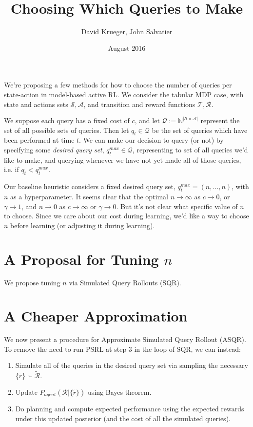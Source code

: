 \documentclass{article}
\title{Choosing Which Queries to Make}
\author{David Krueger, John Salvatier}
\date{August 2016}
\begin{document}
\maketitle


We're proposing a few methods for how to choose the number of queries per state-action in model-based active RL.
We consider the tabular MDP case, with state and actions sets $\mathcal{S}, \mathcal{A}$, and transition and reward functions $\mathcal{T}, \mathcal{R}$.

We suppose each query has a fixed cost of $c$, and let $\mathcal{Q} := \mathbb{N}^{| \mathcal{S} \times \mathcal{A} |}$ represent the set of all possible sets of queries.
Then let $q_t \in \mathcal{Q}$ be the set of queries which have been performed at time $t$.
We can make our decision to query (or not) by specifying some \emph{desired query set}, $q^{max}_t \in \mathcal{Q}$, representing to set of all queries we'd like to make, and querying whenever we have not yet made all of those queries, i.e. if $q_t < q^{max}_t$.

Our baseline heuristic considers a fixed desired query set, $q^{max}_t = (n,...,n)$, with $n$ as a hyperparameter.
It seems clear that the optimal $n \rightarrow \infty$ as $c \rightarrow 0$, or $\gamma \rightarrow 1$, and $n \rightarrow 0$ as $c \rightarrow \infty$ or $\gamma \rightarrow 0$.
But it's not clear what specific value of $n$ to choose.
Since we care about our cost during learning, we'd like a way to choose $n$ before learning (or adjusting it during learning).

\section{A Proposal for Tuning $n$}
We propose tuning $n$ via Simulated Query Rollouts (SQR).


\section{A Cheaper Approximation}
We now present a procedure for Approximate Simulated Query Rollout (ASQR).
To remove the need to run PSRL at step 3 in the loop of SQR, we can instead:

\begin{enumerate}
\item Simulate all of the queries in the desired query set via sampling the necessary $\{\tilde{r}\} \sim \tilde{\mathcal{R}}$.
\item Update $P_{agent} (\mathcal{R} | \{\tilde{r}\})$ using Bayes theorem.
\item Do planning and compute expected performance using the expected rewards under this updated posterior (and the cost of all the simulated queries).
\end{enumerate}
\end{document}
